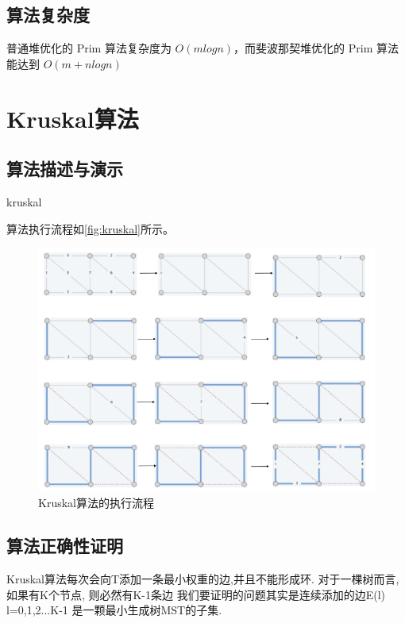 \subsection{算法复杂度}
普通堆优化的 Prim 算法复杂度为 $O(mlogn)$，而斐波那契堆优化的 Prim 算法
能达到 $O(m+nlogn)$

\section{Kruskal算法}\label{sec:kruskal}
\subsection{算法描述与演示}
\begin{algorithm}
	\DontPrintSemicolon
	\caption{kruskal}\label{alg:kruskal}
\end{algorithm}

算法执行流程如\autoref{fig:kruskal}所示。

\begin{figure}[hbt]
	\centering
	\includegraphics[scale=0.5]{image/kruskal.png}
	\caption{Kruskal算法的执行流程}\label{fig:kruskal}
\end{figure}

\subsection{算法正确性证明}
Kruskal算法每次会向T添加一条最小权重的边,并且不能形成环.
对于一棵树而言, 如果有K个节点, 则必然有K-1条边
我们要证明的问题其实是连续添加的边E(l) l=0,1,2...K-1 是一颗最小生成树MST的子集.

